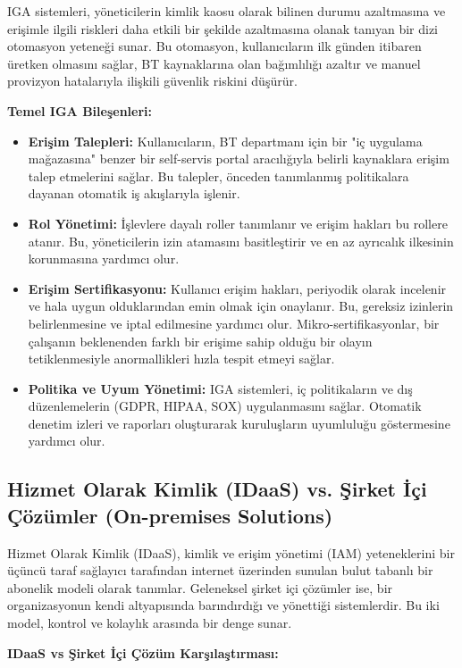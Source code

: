 IGA sistemleri, yöneticilerin kimlik kaosu olarak bilinen durumu azaltmasına ve erişimle ilgili riskleri daha etkili bir şekilde azaltmasına olanak tanıyan bir dizi otomasyon yeteneği sunar. Bu otomasyon, kullanıcıların ilk günden itibaren üretken olmasını sağlar, BT kaynaklarına olan bağımlılığı azaltır ve manuel provizyon hatalarıyla ilişkili güvenlik riskini düşürür.

\textbf{Temel IGA Bileşenleri:}
\begin{itemize}
    \item \textbf{Erişim Talepleri:} Kullanıcıların, BT departmanı için bir "iç uygulama mağazasına" benzer bir self-servis portal aracılığıyla belirli kaynaklara erişim talep etmelerini sağlar. Bu talepler, önceden tanımlanmış politikalara dayanan otomatik iş akışlarıyla işlenir.
    \item \textbf{Rol Yönetimi:} İşlevlere dayalı roller tanımlanır ve erişim hakları bu rollere atanır. Bu, yöneticilerin izin atamasını basitleştirir ve en az ayrıcalık ilkesinin korunmasına yardımcı olur.
    \item \textbf{Erişim Sertifikasyonu:} Kullanıcı erişim hakları, periyodik olarak incelenir ve hala uygun olduklarından emin olmak için onaylanır. Bu, gereksiz izinlerin belirlenmesine ve iptal edilmesine yardımcı olur. Mikro-sertifikasyonlar, bir çalışanın beklenenden farklı bir erişime sahip olduğu bir olayın tetiklenmesiyle anormallikleri hızla tespit etmeyi sağlar.
    \item \textbf{Politika ve Uyum Yönetimi:} IGA sistemleri, iç politikaların ve dış düzenlemelerin (GDPR, HIPAA, SOX) uygulanmasını sağlar. Otomatik denetim izleri ve raporları oluşturarak kuruluşların uyumluluğu göstermesine yardımcı olur.
\end{itemize}

\subsection{Hizmet Olarak Kimlik (IDaaS) vs. Şirket İçi Çözümler (On-premises Solutions)}

Hizmet Olarak Kimlik (IDaaS), kimlik ve erişim yönetimi (IAM) yeteneklerini bir üçüncü taraf sağlayıcı tarafından internet üzerinden sunulan bulut tabanlı bir abonelik modeli olarak tanımlar. Geleneksel şirket içi çözümler ise, bir organizasyonun kendi altyapısında barındırdığı ve yönettiği sistemlerdir. Bu iki model, kontrol ve kolaylık arasında bir denge sunar.

\textbf{IDaaS vs Şirket İçi Çözüm Karşılaştırması:}

